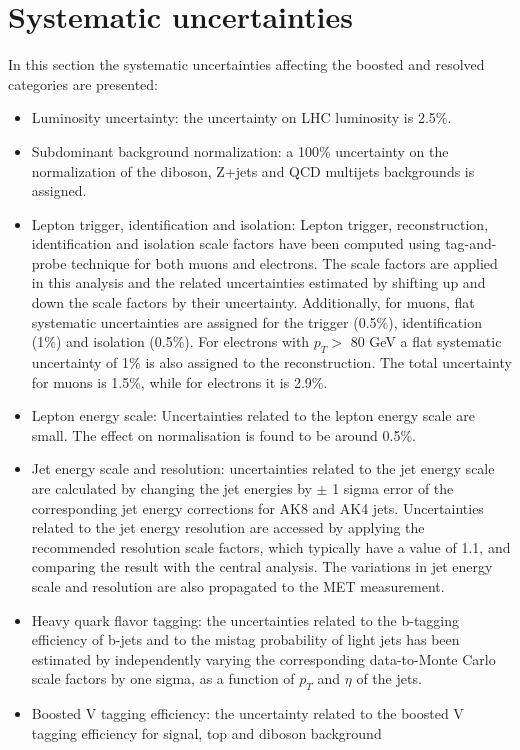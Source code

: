 \section{Systematic uncertainties}
In this section the systematic uncertainties affecting the boosted and resolved categories are
presented:
\begin{itemize}
\item  Luminosity uncertainty:  the uncertainty on LHC luminosity is 2.5\%.
\item Subdominant background normalization: a 100\% uncertainty on the normalization of the diboson, Z+jets and QCD multijets
backgrounds is assigned.
\item Lepton trigger, identification and isolation: Lepton trigger, reconstruction, identification and isolation scale factors have been computed
using tag-and-probe technique for both muons  and electrons. 
The scale factors are applied in this analysis and the related uncertainties estimated by shifting up and down
the scale factors by their uncertainty. Additionally, for muons, flat systematic uncertainties are
assigned for the trigger (0.5\%), identification (1\%) and isolation (0.5\%). 
For electrons with $p_T>$ 80 GeV a flat systematic uncertainty of 1\% is also assigned to the reconstruction. The total
uncertainty for muons is 1.5\%, while for electrons it is 2.9\%.
\item Lepton energy scale: Uncertainties related to the lepton energy scale are small. The effect on normalisation
is found to be around 0.5\%.
\item Jet energy scale and resolution: uncertainties related to the jet energy scale are calculated by changing the jet energies by $\pm$ 1
sigma error of the corresponding jet energy corrections for AK8 and AK4 jets.
Uncertainties related to the jet energy resolution are accessed by applying the recommended
resolution scale factors, which typically have a value of 1.1, and comparing the result with
the central analysis. The variations in jet energy scale and resolution are also propagated to the
MET measurement.
\item Heavy quark flavor tagging: the uncertainties related to the b-tagging efficiency of b-jets and to the mistag probability of
light jets has been estimated by independently varying the corresponding data-to-Monte Carlo
scale factors  by one sigma, as a function of $p_T$ and $\eta$ of the jets.
\item Boosted V tagging efficiency: the uncertainty related to the boosted V tagging efficiency for signal, top and diboson background 

\end{itemize}
